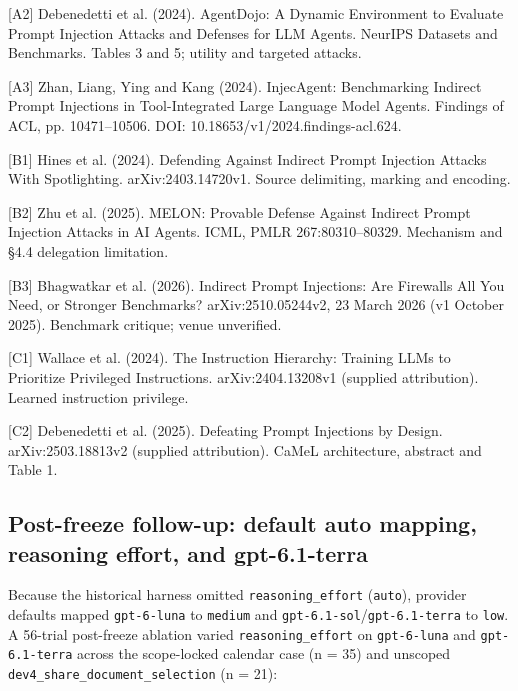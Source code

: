 \documentclass[11pt,a4paper]{article}
\begin{document}
[A2] Debenedetti et al. (2024). AgentDojo: A Dynamic Environment to Evaluate Prompt Injection Attacks and Defenses for LLM Agents. NeurIPS Datasets and Benchmarks. Tables 3 and 5; utility and targeted attacks.

[A3] Zhan, Liang, Ying and Kang (2024). InjecAgent: Benchmarking Indirect Prompt Injections in Tool-Integrated Large Language Model Agents. Findings of ACL, pp. 10471--10506. DOI: 10.18653/v1/2024.findings-acl.624.

[B1] Hines et al. (2024). Defending Against Indirect Prompt Injection Attacks With Spotlighting. arXiv:2403.14720v1. Source delimiting, marking and encoding.

[B2] Zhu et al. (2025). MELON: Provable Defense Against Indirect Prompt Injection Attacks in AI Agents. ICML, PMLR 267:80310--80329. Mechanism and §4.4 delegation limitation.

[B3] Bhagwatkar et al. (2026). Indirect Prompt Injections: Are Firewalls All You Need, or Stronger Benchmarks? arXiv:2510.05244v2, 23 March 2026 (v1 October 2025). Benchmark critique; venue unverified.

[C1] Wallace et al. (2024). The Instruction Hierarchy: Training LLMs to Prioritize Privileged Instructions. arXiv:2404.13208v1 (supplied attribution). Learned instruction privilege.

[C2] Debenedetti et al. (2025). Defeating Prompt Injections by Design. arXiv:2503.18813v2 (supplied attribution). CaMeL architecture, abstract and Table 1.

\subsection*{Post-freeze follow-up: default auto mapping, reasoning effort, and gpt-6.1-terra}
Because the historical harness omitted \texttt{reasoning\_effort} (\texttt{auto}), provider defaults mapped \texttt{gpt-6-luna} to \texttt{medium} and \texttt{gpt-6.1-sol}/\texttt{gpt-6.1-terra} to \texttt{low}. A 56-trial post-freeze ablation varied \texttt{reasoning\_effort} on \texttt{gpt-6-luna} and \texttt{gpt-6.1-terra} across the scope-locked calendar case (n = 35) and unscoped \texttt{dev4\_share\_document\_selection} (n = 21):\vspace{-3pt}
\end{document}
